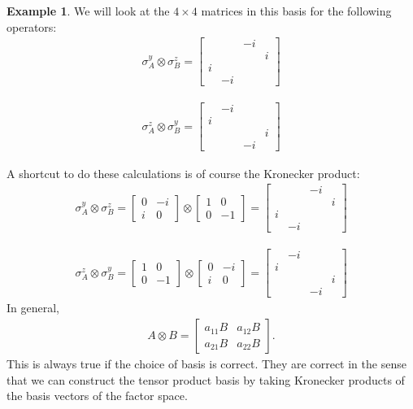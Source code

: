 \documentclass{book}
\theoremstyle{definition}
\newtheorem{exmp}{Example}[section]
\begin{document}
\begin{exmp}
	We will look at the $4\times 4$ matrices in this basis for the following operators:
	\begin{align}
	\sigma_A^y \otimes \sigma_B^z = \begin{bmatrix}
	&&-i&\\
	&&&i\\
	i&&&\\
	&-i&&
	\end{bmatrix}
	\end{align}
	
	\begin{align}
	\sigma^z_A \otimes \sigma^y_B = \begin{bmatrix}
	&-i&& \\
	i&&&\\
	&&&i\\
	&&-i&
	\end{bmatrix}
	\end{align}
\end{exmp}

A shortcut to do these calculations is of course the Kronecker product:
\begin{align}
\sigma_A^y \otimes \sigma_B^z = 
\begin{bmatrix}
0 & -i \\ i & 0
\end{bmatrix} \otimes \begin{bmatrix}
1 & 0 \\ 0 & -1
\end{bmatrix}
=\begin{bmatrix}
&&-i&\\
&&&i\\
i&&&\\
&-i&&
\end{bmatrix}
\end{align}

\begin{align}
\sigma^z_A \otimes \sigma^y_B = 
\begin{bmatrix}
1 & 0 \\ 0 & -1
\end{bmatrix} \otimes \begin{bmatrix}
0 & -i \\ i & 0
\end{bmatrix}  
=\begin{bmatrix}
&-i&& \\
i&&&\\
&&&i\\
&&-i&
\end{bmatrix}
\end{align}
In general, 
\begin{align}
A \otimes B = \begin{bmatrix}
a_{11}B & a_{12}B \\ a_{21}B & a_{22}B
\end{bmatrix}.
\end{align}
This is always true if the choice of basis is correct. They are correct in the sense that we can construct the tensor product basis by taking Kronecker products of the basis vectors of the factor space. \\
\end{document}
